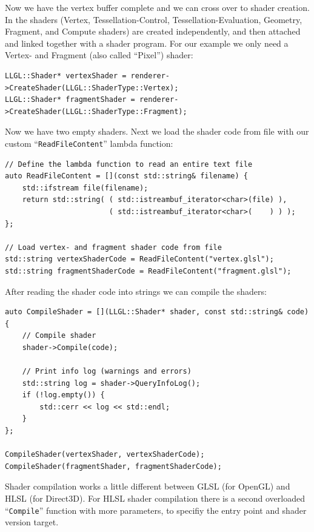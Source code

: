 \documentclass{article}
\begin{document}
Now we have the vertex buffer complete and we can cross over to shader creation.
In \LLGL the shaders (Vertex, Tessellation-Control, Tessellation-Evaluation, Geometry, Fragment, and Compute shaders)
are created independently, and then attached and linked together with a shader program.
For our example we only need a Vertex- and Fragment (also called ``Pixel'') shader:
\begin{lstlisting}
LLGL::Shader* vertexShader = renderer->CreateShader(LLGL::ShaderType::Vertex);
LLGL::Shader* fragmentShader = renderer->CreateShader(LLGL::ShaderType::Fragment);
\end{lstlisting}
Now we have two empty shaders. Next we load the shader code from file with
our custom ``\texttt{ReadFileContent}'' lambda function:
\begin{lstlisting}
// Define the lambda function to read an entire text file
auto ReadFileContent = [](const std::string& filename) {
    std::ifstream file(filename);
    return std::string( ( std::istreambuf_iterator<char>(file) ),
                        ( std::istreambuf_iterator<char>(    ) ) );
};

// Load vertex- and fragment shader code from file
std::string vertexShaderCode = ReadFileContent("vertex.glsl");
std::string fragmentShaderCode = ReadFileContent("fragment.glsl");
\end{lstlisting}

After reading the shader code into strings we can compile the shaders:
\begin{lstlisting}
auto CompileShader = [](LLGL::Shader* shader, const std::string& code) {
    // Compile shader
    shader->Compile(code);
    
    // Print info log (warnings and errors)
    std::string log = shader->QueryInfoLog();
    if (!log.empty()) {
        std::cerr << log << std::endl;
    }
};

CompileShader(vertexShader, vertexShaderCode);
CompileShader(fragmentShader, fragmentShaderCode);
\end{lstlisting}
Shader compilation works a little different between GLSL (for OpenGL) and HLSL (for Direct3D).
For HLSL shader compilation there is a second overloaded ``\texttt{Compile}'' function with more parameters,
to specifiy the entry point and shader version target.
\end{document}
